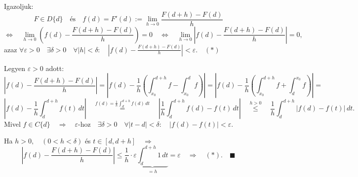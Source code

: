 \documentclass[a4paper,11.5pt]{article}
\begin{document}
\begin{enumerate}
		Igazoljuk:
		\[ F\in D\{d\} \quad \text{és}\quad f(d)=F'(d):=\lim_{h\to0}\frac{F(d+h)-F(d)}{h} \]
		\[ \Leftrightarrow\quad \lim_{h\to0}\left(f(d)-\frac{F(d+h)-F(d)}{h}\right)=0\quad \Leftrightarrow\quad \lim_{h\to0}\left|f(d)-\frac{F(d+h)-F(d)}{h}\right|=0, \]
		azaz \quad $\displaystyle\forall\varepsilon>0\quad \exists\delta>0\quad \forall|h|<\delta:\quad \left|f(d)-\frac{F(d+h)-F(d)}{h}\right|<\varepsilon.\quad  (*)$
		
		\smallskip
		Legyen $\varepsilon>0$ adott:
		\[ \left|f(d)-\frac{F(d+h)-F(d)}{h}\right|=\left|f(d)-\frac{1}{h}\left(\int_{x_0}^{d+h}f-\int_{x_0}^{d}f\right)\right|=\left|f(d)-\frac{1}{h}\left(\int_{x_0}^{d+h}f+\int_{d}^{x_0}f\right)\right|=\]
		\[\left|f(d)-\frac{1}{h}\int_{d}^{d+h}f(t)\,dt\right| \quad  \overset{f(d)=\frac{1}{h}\int_{d}^{d+h}f(d)\,dt}{=}\quad \left|\frac{1}{h}\int_{d}^{d+h}f(d)-f(t)\,dt\right|\quad \overset{h>0}{\leq}\quad \frac{1}{h}\int_d^{d+h}|f(d)-f(t)|\,dt. \]
		Mivel $f\in C\{d\}\quad \Rightarrow\quad \varepsilon$-hoz$\quad \exists\delta>0\quad \forall|t-d|<\delta:\quad |f(d)-f(t)|<\varepsilon$.
		
		\smallskip
		Ha $h>0,\quad (0<h<\delta)$ és $t\in[d,d+h]\quad \Rightarrow$
		\[ \left|f(d)-\frac{F(d+h)-F(d)}{h}\right|\leq\frac{1}{h}\cdot\varepsilon\underbrace{\int_d^{d+h}1\,dt}_{=h}=\varepsilon\quad \Rightarrow\quad (*).\quad \blacksquare \]
	\end{enumerate}
\end{document}
